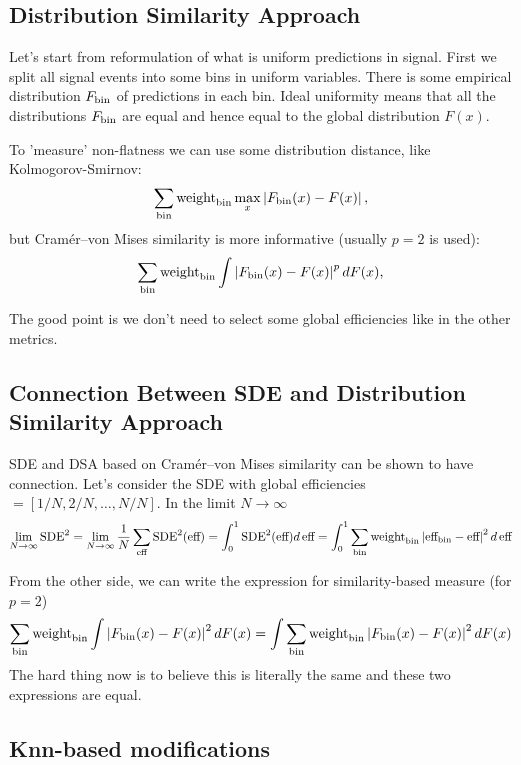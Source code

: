 \subsection{Distribution Similarity Approach}
\label{sec:similarity}

Let's start from reformulation of what is uniform predictions in signal. First we split all signal events into some bins in uniform variables. There is some empirical distribution $F_{\text{bin}}$ of predictions in each bin. Ideal uniformity means that all the distributions $F_{\text{bin}}$ are equal and hence equal to the global distribution $F(x)$. 

To 'measure' non-flatness we can use some distribution distance, like Kolmogorov-Smirnov:
\[
	 \sum_{\text{bin}} \text{weight}_\text{bin} \max_x \left\vert F_{\text{bin}}(x) - F(x)\right\vert,
\]
but Cram\'er--von Mises similarity is more informative (usually $p=2$ is used):
\[
	 \sum_{\text{bin}} \text{weight}_\text{bin} \int \left\vert F_{\text{bin}}(x) - F(x)\right\vert^p dF(x),
\]

The good point is we don't need to select some global efficiencies like in the other metrics.


\subsection{Connection Between SDE and Distribution Similarity Approach}

SDE and DSA based on Cram\'er--von Mises similarity can be shown to have connection.
Let's consider the SDE with global efficiencies $= [1/N, 2/N, \dots, N/N]$. In the limit $N \to \infty$
\[
	\lim_{N \to \infty} \text{SDE}^2 = 
	\lim_{N \to \infty} \frac{1}{N} \sum_{\text{eff}}\text{SDE}^2(\text{eff}) = 
	\int_0^1 \text{SDE}^2(\text{eff}) d\, \text{eff} = 
	\int_0^1 \sum_{\text{bin}} \text{weight}_\text{bin} \left\vert\text{eff}_\text{bin} - \text{eff}\right\vert^2 d\, \text{eff}
\]

From the other side, we can write the expression for similarity-based measure (for $p=2$) 
\[
	\sum_{\text{bin}} \text{weight}_\text{bin} \int \left\vert F_\text{bin}(x) - F(x)\right\vert^2 dF(x) =
	\int \sum_{\text{bin}} \text{weight}_\text{bin} \left\vert F_\text{bin}(x) - F(x)\right\vert^2 dF(x) 
\] The hard thing now is to believe this is literally the same and these two expressions are equal.


\subsection{Knn-based modifications}

\def\knni{\text{knn}(i)}
\def\effknni{\text{eff}_{\knni}}
\def\weightknni{\text{weight}_{\knni}}
\def\Fknn{F_{\knni}}

